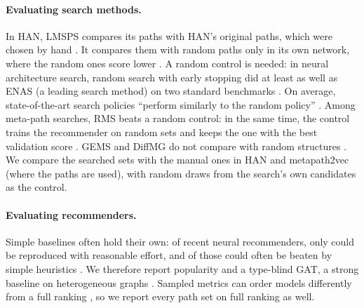 \paragraph{Evaluating search methods.} In HAN, LMSPS compares its paths with HAN's original paths,
which were chosen by hand \citep[Table~4]{li2024longrange}. It compares them with random paths only
in its own network, where the random ones score lower \citep[Table~1]{li2024longrange}. A random
control is needed: in neural architecture search, random search with early stopping did at least as well as ENAS (a
leading search method) on two standard benchmarks \citep{li2019random}. On average,
state-of-the-art search policies ``perform similarly to the random policy''
\citep{yu2020evaluating}. Among meta-path searches, RMS beats a random control: in the same time,
the control trains the recommender on random sets and keeps the one with the best validation score
\citep{ning2022automatic}. GEMS and DiffMG do not compare with random structures
\citep{han2020genetic,ding2021diffmg}. We compare the searched sets with the manual ones in HAN and
metapath2vec (where the paths are used), with random draws from the search's own candidates as the
control.

\paragraph{Evaluating recommenders.} Simple baselines often hold their own: of
 recent neural recommenders, only  could be reproduced with
reasonable effort, and  of those could often be beaten by simple heuristics
\citep{dacrema2019progress}. We therefore report popularity and a type-blind GAT, a strong baseline
on heterogeneous graphs \citep{lv2021hgb}. Sampled metrics can order models differently from a
full ranking \citep{krichene2022sampled}, so we report every path set on full ranking as well.
